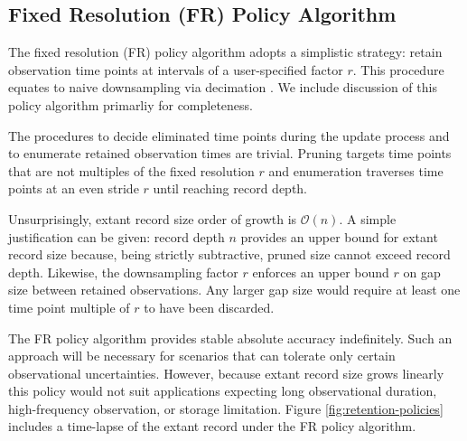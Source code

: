 \subsection{Fixed Resolution (FR) Policy Algorithm}
\label{sec:fixed-resolution-algo}

The fixed resolution (FR) policy algorithm adopts a simplistic strategy: retain observation time points at intervals of a user-specified factor $r$.
This procedure equates to naive downsampling via decimation \citep[p. 31]{crochiere1983multirate}.
We include discussion of this policy algorithm primarliy for completeness.

The procedures to decide eliminated time points during the update process and to enumerate retained observation times are trivial.
Pruning targets time points that are not multiples of the fixed resolution $r$ and enumeration traverses time points at an even stride $r$ until reaching record depth.

Unsurprisingly, extant record size order of growth is $\mathcal{O}(n)$.
A simple justification can be given: record depth $n$ provides an upper bound for extant record size because, being strictly subtractive, pruned size cannot exceed record depth.
Likewise, the downsampling factor $r$ enforces an upper bound $r$ on gap size between retained observations.
Any larger gap size would require at least one time point multiple of $r$ to have been discarded.
% 
% 

The FR policy algorithm provides stable absolute accuracy indefinitely.
Such an approach will be necessary for scenarios that can tolerate only certain observational uncertainties.
However, because extant record size grows linearly this policy would not suit applications expecting long observational duration, high-frequency observation, or storage limitation.
Figure \ref{fig:retention-policies} includes a time-lapse of the extant record under the FR policy algorithm.

% 
% 
